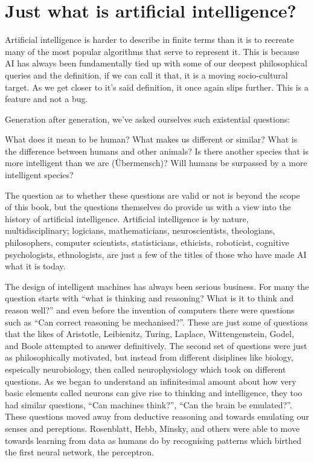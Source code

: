 \documentclass[]{book}
\theoremstyle{definition}
\theoremstyle{definition}
\theoremstyle{definition}
\theoremstyle{remark}
\begin{document}
\section{Just what is artificial
intelligence?}\label{just-what-is-artificial-intelligence}

Artificial intelligence is harder to describe in finite terms than it is
to recreate many of the most popular algorithms that serve to represent
it. This is because AI has always been fundamentally tied up with some
of our deepest philosophical queries and the definition, if we can call
it that, it is a moving socio-cultural target. As we get closer to it's
said definition, it once again slips further. This is a feature and not
a bug.

Generation after generation, we've asked ourselves such existential
questions:

What does it mean to be human? What makes us different or similar? What
is the difference between humans and other animals? Is there another
species that is more intelligent than we are (Übermensch)? Will humans
be surpassed by a more intelligent species?

The question as to whether these questions are valid or not is beyond
the scope of this book, but the questions themselves do provide us with
a view into the history of artificial intelligence. Artificial
intelligence is by nature, multidisciplinary; logicians, mathematicians,
neuroscientists, theologians, philosophers, computer scientists,
statisticians, ethicists, roboticist, cognitive psychologists,
ethnologists, are just a few of the titles of those who have made AI
what it is today.

The design of intelligent machines has always been serious business. For
many the question starts with ``what is thinking and reasoning? What is
it to think and reason well?'' and even before the invention of
computers there were questions such as ``Can correct reasoning be
mechanised?''. These are just some of questions that the likes of
Aristotle, Leibienitz, Turing, Laplace, Wittengenstein, Godel, and Boole
attempted to answer definitively. The second set of questions were just
as philosophically motivated, but instead from different disiplines like
biology, espeically neurobiology, then called neurophysiology which took
on different questions. As we began to understand an infinitesimal
amount about how very basic elements called neurons can give rise to
thinking and intelligence, they too had similar questions, ``Can
machines think?'', ``Can the brain be emulated?''. These questions moved
away from deductive reasoning and towards emulating our senses and
pereptions. Rosenblatt, Hebb, Minsky, and others were able to move
towards learning from data as humans do by recognising patterns which
birthed the first neural network, the perceptron.
\end{document}
